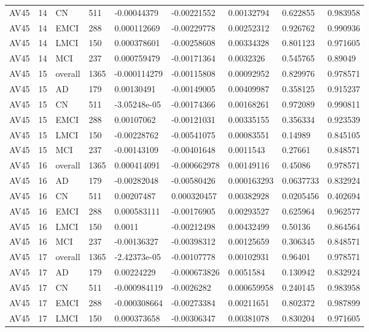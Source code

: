 \begin{landscape}
\begin{longtable}{lllllllll}
AV45 & 14 & CN & 511 & -0.00044379 & -0.00221552 & 0.00132794 & 0.622855 & 0.983958 \\
AV45 & 14 & EMCI & 288 & 0.000112669 & -0.00229778 & 0.00252312 & 0.926762 & 0.990936 \\
AV45 & 14 & LMCI & 150 & 0.000378601 & -0.00258608 & 0.00334328 & 0.801123 & 0.971605 \\
AV45 & 14 & MCI & 237 & 0.000759479 & -0.00171364 & 0.0032326 & 0.545765 & 0.89049 \\
AV45 & 15 & overall & 1365 & -0.000114279 & -0.00115808 & 0.00092952 & 0.829976 & 0.978571 \\
AV45 & 15 & AD & 179 & 0.00130491 & -0.00149005 & 0.00409987 & 0.358125 & 0.915237 \\
AV45 & 15 & CN & 511 & -3.05248e-05 & -0.00174366 & 0.00168261 & 0.972089 & 0.990811 \\
AV45 & 15 & EMCI & 288 & 0.00107062 & -0.00121031 & 0.00335155 & 0.356334 & 0.923539 \\
AV45 & 15 & LMCI & 150 & -0.00228762 & -0.00541075 & 0.00083551 & 0.14989 & 0.845105 \\
AV45 & 15 & MCI & 237 & -0.00143109 & -0.00401648 & 0.0011543 & 0.27661 & 0.848571 \\
AV45 & 16 & overall & 1365 & 0.000414091 & -0.000662978 & 0.00149116 & 0.45086 & 0.978571 \\
AV45 & 16 & AD & 179 & -0.00282048 & -0.00580426 & 0.000163293 & 0.0637733 & 0.832924 \\
AV45 & 16 & CN & 511 & 0.00207487 & 0.000320457 & 0.00382928 & 0.0205456 & 0.402694 \\
AV45 & 16 & EMCI & 288 & 0.000583111 & -0.00176905 & 0.00293527 & 0.625964 & 0.962577 \\
AV45 & 16 & LMCI & 150 & 0.0011 & -0.00212498 & 0.00432499 & 0.50136 & 0.864564 \\
AV45 & 16 & MCI & 237 & -0.00136327 & -0.00398312 & 0.00125659 & 0.306345 & 0.848571 \\
AV45 & 17 & overall & 1365 & -2.42373e-05 & -0.00107778 & 0.00102931 & 0.96401 & 0.978571 \\
AV45 & 17 & AD & 179 & 0.00224229 & -0.000673826 & 0.0051584 & 0.130942 & 0.832924 \\
AV45 & 17 & CN & 511 & -0.000984119 & -0.0026282 & 0.000659958 & 0.240145 & 0.983958 \\
AV45 & 17 & EMCI & 288 & -0.000308664 & -0.00273384 & 0.00211651 & 0.802372 & 0.987899 \\
AV45 & 17 & LMCI & 150 & 0.000373658 & -0.00306347 & 0.00381078 & 0.830204 & 0.971605 \\

\end{longtable}
\end{landscape}
